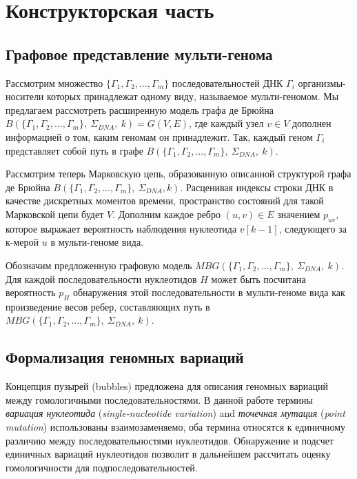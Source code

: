 \section{Конструкторская часть}

\subsection{Графовое представление мульти-генома}

Рассмотрим множество $ \{\Gamma_1,\Gamma_2,\ldots,\Gamma_m\} $ последовательностей ДНК $ \Gamma_i $ организмы-носители которых принадлежат одному виду, называемое мульти-геномом\cite{15_brandenburger2018multi,16_zekic2018pan}. Мы предлагаем рассмотреть расширенную модель графа де Брюйна $ B\left(\{\Gamma_1,\Gamma_2,\ldots,\Gamma_m\},\ \Sigma_{DNA}, \ k\right)=G\left(V,E\right) $, где каждый узел $ v \in V $ дополнен информацией о том, каким геномам он принадлежит. Так, каждый геном $ \Gamma_i $ представляет собой путь в графе $ B\left(\{\Gamma_1,\Gamma_2,\ldots,\Gamma_m\},\ \Sigma_{DNA},\ k\right) $. 

Рассмотрим теперь Марковскую цепь, образованную\cite{17_heath2021computing} описанной структурой графа де Брюйна $ B\left(\{\Gamma_1,\Gamma_2,\ldots,\Gamma_m\},\ \Sigma_{DNA}, k\right) $. Расценивая индексы строки ДНК в качестве дискретных моментов времени, пространство состояний для такой Марковской цепи будет $ V $. Дополним каждое ребро $ \left(u,v\right) \in E $ значением $ p_{uv} $, которое выражает вероятность наблюдения нуклеотида $ v\left[k-1\right] $, следующего за к-мерой $ u $ в мульти-геноме вида. 

Обозначим предложенную графовую модель $ MBG\left(\{\Gamma_1,\Gamma_2,\ldots,\Gamma_m\},\ \Sigma_{DNA},\ k\right) $. Для каждой последовательности нуклеотидов $ H $ может быть посчитана вероятность $ p_H $ обнаружения этой последовательности в мульти-геноме вида как произведение весов ребер, составляющих путь в $ MBG\left(\{\Gamma_1,\Gamma_2,\ldots,\Gamma_m\},\ \Sigma_{DNA},\ k\right) $.

\subsection{Формализация геномных вариаций}
Концепция пузырей (bubbles) предложена\cite{18_minkin2020applications,19_dabbaghie2021bubblegun} для описания геномных вариаций между гомологичными последовательностями. В данной работе термины \textit{вариация нуклеотида} (\textit{single-nucleotide variation}) and \textit{точечная мутация} (\textit{point mutation}) использованы взаимозаменяемо, оба термина относятся к единичному различию между последовательностями нуклеотидов. Обнаружение и подсчет единичных вариаций нуклеотидов позволит в дальнейшем рассчитать оценку гомологичности для подпоследовательностей. 

